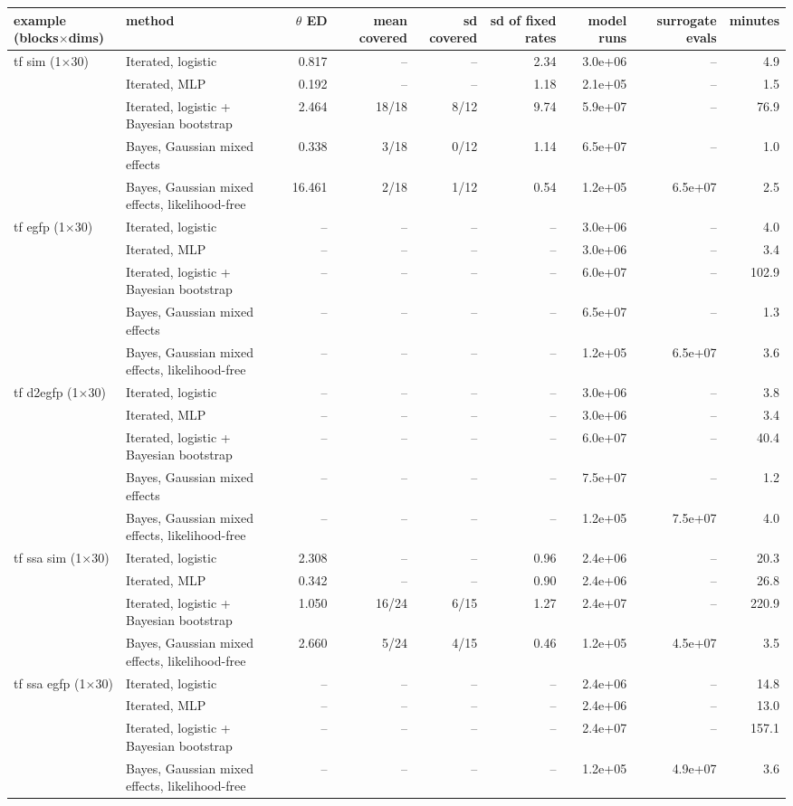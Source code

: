 \begin{tabular}{llrrrrrrr}
\toprule
example (blocks$\times$dims) & method & $\theta$ ED & mean covered & sd covered & sd of fixed rates & model runs & surrogate evals & minutes \\
\midrule
tf sim (1$\times$30) & Iterated, logistic & 0.817 & -- & -- & 2.34 & 3.0e+06 & -- & 4.9 \\
 & Iterated, MLP & 0.192 & -- & -- & 1.18 & 2.1e+05 & -- & 1.5 \\
 & Iterated, logistic + Bayesian bootstrap & 2.464 & 18/18 & 8/12 & 9.74 & 5.9e+07 & -- & 76.9 \\
 & Bayes, Gaussian mixed effects & 0.338 & 3/18 & 0/12 & 1.14 & 6.5e+07 & -- & 1.0 \\
 & Bayes, Gaussian mixed effects, likelihood-free & 16.461 & 2/18 & 1/12 & 0.54 & 1.2e+05 & 6.5e+07 & 2.5 \\ \addlinespace
tf egfp (1$\times$30) & Iterated, logistic & -- & -- & -- & -- & 3.0e+06 & -- & 4.0 \\
 & Iterated, MLP & -- & -- & -- & -- & 3.0e+06 & -- & 3.4 \\
 & Iterated, logistic + Bayesian bootstrap & -- & -- & -- & -- & 6.0e+07 & -- & 102.9 \\
 & Bayes, Gaussian mixed effects & -- & -- & -- & -- & 6.5e+07 & -- & 1.3 \\
 & Bayes, Gaussian mixed effects, likelihood-free & -- & -- & -- & -- & 1.2e+05 & 6.5e+07 & 3.6 \\ \addlinespace
tf d2egfp (1$\times$30) & Iterated, logistic & -- & -- & -- & -- & 3.0e+06 & -- & 3.8 \\
 & Iterated, MLP & -- & -- & -- & -- & 3.0e+06 & -- & 3.4 \\
 & Iterated, logistic + Bayesian bootstrap & -- & -- & -- & -- & 6.0e+07 & -- & 40.4 \\
 & Bayes, Gaussian mixed effects & -- & -- & -- & -- & 7.5e+07 & -- & 1.2 \\
 & Bayes, Gaussian mixed effects, likelihood-free & -- & -- & -- & -- & 1.2e+05 & 7.5e+07 & 4.0 \\ \addlinespace
tf ssa sim (1$\times$30) & Iterated, logistic & 2.308 & -- & -- & 0.96 & 2.4e+06 & -- & 20.3 \\
 & Iterated, MLP & 0.342 & -- & -- & 0.90 & 2.4e+06 & -- & 26.8 \\
 & Iterated, logistic + Bayesian bootstrap & 1.050 & 16/24 & 6/15 & 1.27 & 2.4e+07 & -- & 220.9 \\
 & Bayes, Gaussian mixed effects, likelihood-free & 2.660 & 5/24 & 4/15 & 0.46 & 1.2e+05 & 4.5e+07 & 3.5 \\ \addlinespace
tf ssa egfp (1$\times$30) & Iterated, logistic & -- & -- & -- & -- & 2.4e+06 & -- & 14.8 \\
 & Iterated, MLP & -- & -- & -- & -- & 2.4e+06 & -- & 13.0 \\
 & Iterated, logistic + Bayesian bootstrap & -- & -- & -- & -- & 2.4e+07 & -- & 157.1 \\
 & Bayes, Gaussian mixed effects, likelihood-free & -- & -- & -- & -- & 1.2e+05 & 4.9e+07 & 3.6 \\
\bottomrule
\end{tabular}
